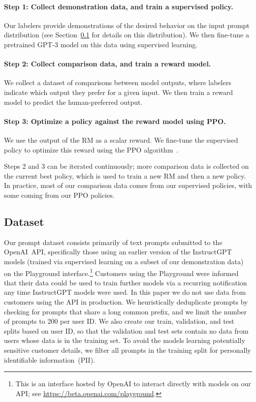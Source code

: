 \paragraph{Step 1: Collect demonstration data, and train a supervised policy.} Our labelers provide demonstrations of the desired behavior on the input prompt distribution (see Section~\ref{sec:dataset} for details on this distribution). We then fine-tune a pretrained GPT-3 model on this data using supervised learning.

\paragraph{Step 2: Collect comparison data, and train a reward model.} We collect a dataset of comparisons between model outputs, where labelers indicate which output they prefer for a given input. We then train a reward model to predict the human-preferred output.

\paragraph{Step 3: Optimize a policy against the reward model using PPO.} We use the output of the RM as a scalar reward. We fine-tune the supervised policy to optimize this reward using the PPO algorithm~\citep{schulman2017proximal}.

Steps 2 and 3 can be iterated continuously; more comparison data is collected on the current best policy, which is used to train a new RM and then a new policy. In practice, most of our comparison data comes from our supervised policies, with some coming from our PPO policies.

\subsection{Dataset}
\label{sec:dataset}

Our prompt dataset consists primarily of text prompts submitted to the OpenAI~API, specifically those using an earlier version of the InstructGPT models (trained via supervised learning on a subset of our demonstration data) on the Playground interface.\footnote{This is an interface hosted by OpenAI to interact directly with models on our API; see \url{https://beta.openai.com/playground}.} 
Customers using the Playground were informed that their data could be used to train further models via a recurring notification any time InstructGPT models were used. In this paper we do not use data from customers using the API in production. We heuristically deduplicate prompts by checking for prompts that share a long common prefix, and we limit the number of prompts to 200 per user ID.  We also create our train, validation, and test splits based on user ID, so that the validation and test sets contain no data from users whose data is in the training set.  To avoid the models learning potentially sensitive customer details, we filter all prompts in the training split for personally identifiable information~(PII).

